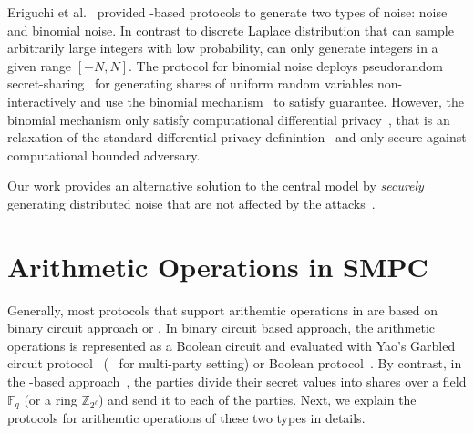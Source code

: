 Eriguchi et al.~\cite{eriguchi2021efficient} provided \smpc-based protocols to generate two types of noise: \fdl noise and binomial noise. In contrast to discrete Laplace distribution that can sample arbitrarily large integers with low probability, \fdl can only generate integers in a given range $\left[-N,N\right] $. The protocol for binomial noise deploys pseudorandom secret-sharing~\cite{cramer2005share} for generating shares of uniform random variables non-interactively and use the binomial mechanism~\cite{agarwal2018cpsgd} to satisfy \differentialprivacy guarantee. However, the binomial mechanism only satisfy computational differential privacy~\cite{mironov2009computational}, that is an relaxation of the standard differential privacy definintion~\cite{dwork2014algorithmic} and only secure against computational bounded adversary.

Our work provides an alternative solution to the central \differentialprivacy model by \textit{securely} generating distributed noise that are not affected by the attacks~\cite{mironov2012significance,jin2022we}.


\section{Arithmetic Operations in SMPC}
\label{ArithmeticOperationsinSMPC}

Generally, most \smpc protocols that support arithemtic operations in \smpc are based on binary circuit approach or \lsss. In binary circuit based approach, the arithmetic operations is represented as a Boolean circuit and evaluated with Yao's Garbled circuit protocol~\cite{yao1986generate} (\bmr~\cite{beaver1990round} for multi-party setting) or Boolean \gmw protocol~\cite{goldreich1987play}.
By contrast, in the \lsss-based approach~\cite{chaum1988multiparty,ben1988completeness}, the parties divide their secret values into shares over a field $\mathbb{F} _q$ (or a ring $\mathbb{Z} _{2^{\ell}}$) and send it to each of the parties. Next, we explain the \smpc protocols for arithemtic operations of these two types in details.


